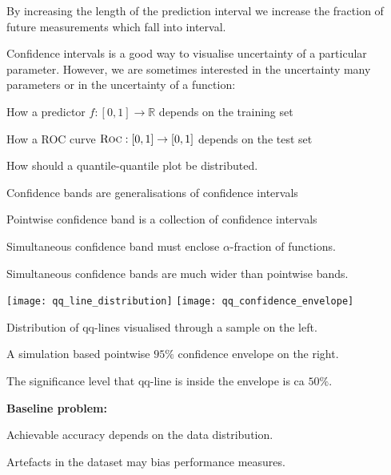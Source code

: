 \documentclass[landscape,footrule]{foils}
\begin{document}


By increasing the length of the prediction interval we increase the fraction of future measurements which fall into interval.




Confidence intervals is a good way to visualise uncertainty of a particular parameter.
However, we are sometimes interested in the uncertainty many parameters or in the uncertainty of a function:
\begin{triangles}
\item How a predictor $f:[0,1]\to\mathbb{R}$ depends on the training set
\item How a ROC curve $\textsc{Roc}:[0,1]\to[0,1]$ depends on the test set
\item How should a quantile-quantile plot be distributed.
\end{triangles}
\vspace*{4ex}

Confidence bands are generalisations of confidence intervals
\begin{triangles}
\item Pointwise confidence band is a collection of confidence intervals
\item Simultaneous confidence band must enclose $\alpha$-fraction of functions.  
\item Simultaneous confidence bands are much wider than pointwise bands.  
\end{triangles}


\enlargethispage{0.5cm}
\centerline{
\texttt{[image: qq\_line\_distribution]}
\texttt{[image: qq\_confidence\_envelope]}}
\begin{triangles}
\item Distribution of qq-lines visualised through a sample on the left.
\item A simulation based pointwise $95\%$ confidence envelope on the right.
\item The significance level that qq-line is inside the envelope is ca $50\%$.
\end{triangles}


\textbf{Baseline problem:}
\begin{triangles}
\item Achievable accuracy depends on the data distribution. 
\item Artefacts in the dataset may bias performance measures.
\end{triangles}
\vspace*{2ex}
\end{document}
